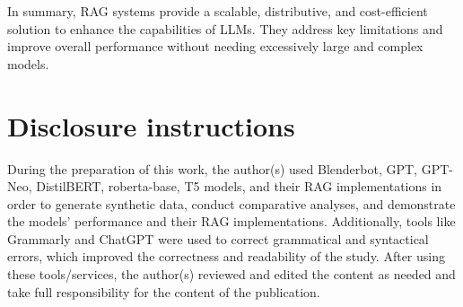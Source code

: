 \documentclass{wseas}
\begin{document}
In summary, RAG systems provide a scalable, distributive, and cost-efficient solution to enhance the capabilities of LLMs. 
They address key limitations and improve overall performance without needing excessively large and complex models. 

\section{Disclosure instructions}

During the preparation of this work, the author(s) used Blenderbot, GPT, GPT-Neo, DistilBERT, roberta-base, T5 models, and their RAG implementations in order to generate synthetic data, conduct comparative analyses, and demonstrate the models' performance and their RAG implementations. Additionally, tools like Grammarly and ChatGPT were used to correct grammatical and syntactical errors, which improved the correctness and readability of the study. After using these tools/services, the author(s) reviewed and edited the content as needed and take full responsibility for the content of the publication.
\end{document}
